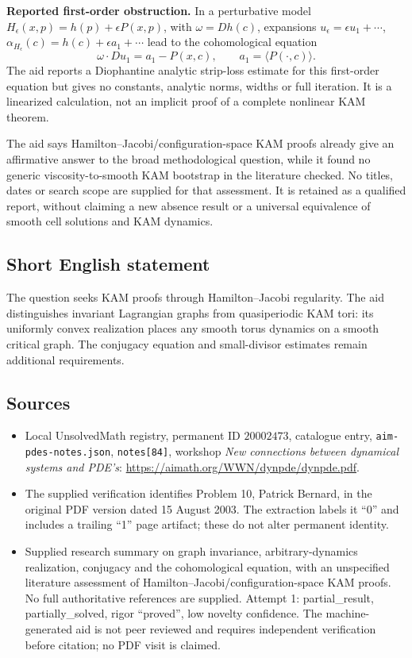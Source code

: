 \documentclass[11pt]{article}
\begin{document}
\textbf{Reported first-order obstruction.} In a perturbative model \(H_\epsilon(x,p)=h(p)+\epsilon P(x,p)\), with \(\omega=Dh(c)\), expansions \(u_\epsilon=\epsilon u_1+\cdots\), \(\alpha_{H_\epsilon}(c)=h(c)+\epsilon a_1+\cdots\) lead to the cohomological equation
\[
 \omega\cdot Du_1=a_1-P(x,c),\qquad
 a_1=\langle P(\cdot,c)\rangle.
\]
The aid reports a Diophantine analytic strip-loss estimate for this first-order equation but gives no constants, analytic norms, widths or full iteration. It is a linearized calculation, not an implicit proof of a complete nonlinear KAM theorem.

The aid says Hamilton--Jacobi/configuration-space KAM proofs already give an affirmative answer to the broad methodological question, while it found no generic viscosity-to-smooth KAM bootstrap in the literature checked. No titles, dates or search scope are supplied for that assessment. It is retained as a qualified report, without claiming a new absence result or a universal equivalence of smooth cell solutions and KAM dynamics.
\subsection{Short English statement}
The question seeks KAM proofs through Hamilton--Jacobi regularity. The aid distinguishes invariant Lagrangian graphs from quasiperiodic KAM tori: its uniformly convex realization places any smooth torus dynamics on a smooth critical graph. The conjugacy equation and small-divisor estimates remain additional requirements.
\subsection{Sources}
\begin{itemize}
\item Local UnsolvedMath registry, permanent ID \(20002473\), catalogue entry, \texttt{aim-pdes-notes.json}, \texttt{notes[84]}, workshop \emph{New connections between dynamical systems and PDE's}: \url{https://aimath.org/WWN/dynpde/dynpde.pdf}.
\item The supplied verification identifies Problem 10, Patrick Bernard, in the original PDF version dated 15 August 2003. The extraction labels it ``0'' and includes a trailing ``1'' page artifact; these do not alter permanent identity.
\item Supplied research summary on graph invariance, arbitrary-dynamics realization, conjugacy and the cohomological equation, with an unspecified literature assessment of Hamilton--Jacobi/configuration-space KAM proofs. No full authoritative references are supplied. Attempt 1: partial\_result, partially\_solved, rigor ``proved'', low novelty confidence. The machine-generated aid is not peer reviewed and requires independent verification before citation; no PDF visit is claimed.
\end{itemize}
\end{document}
